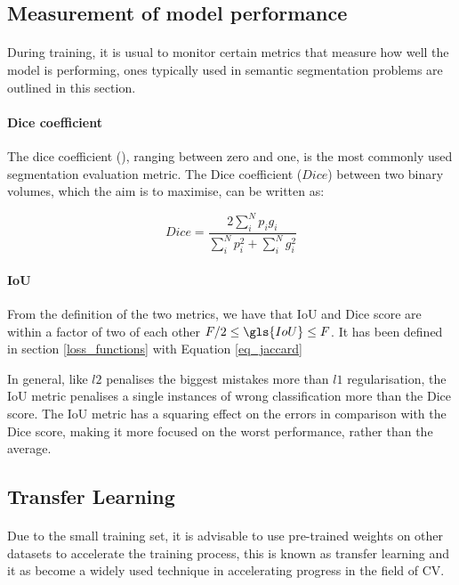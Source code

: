 \subsection{Measurement of model performance} \label{performance_measures}
\paragraph{}
During training, it is usual to monitor certain metrics that measure how well the model is performing, ones typically used in semantic segmentation problems are outlined in this section.
\paragraph{Dice coefficient}
The dice coefficient (\cite{7785132}), ranging between zero and one, is the most commonly used segmentation evaluation metric. The Dice coefficient ($Dice$) between two binary volumes, which the aim is to maximise, can be written as:

\begin{equation}
    \label{eq_dice_coef}
    Dice=\frac{2\sum_{{i}}^{N}p_{i}g_{i}}{\sum_{i}^{N}p_{i}^{2}+\sum_{i}^{N}g_{{i}}^{2}}
\end{equation}

\paragraph{\gls{IoU}}
From the definition of the two metrics, we have that \gls{IoU} and Dice score are within a factor of two of each other $F/2 \leq \gls{IoU} \leq F$. It has been defined in section \ref{loss_functions} with Equation \ref{eq_jaccard}

In general, like $l2$ penalises the biggest mistakes more than $l1$ regularisation, the \gls{IoU} metric penalises a single instances of wrong classification more than the Dice score. The \gls{IoU} metric has a squaring effect on the errors in comparison with the Dice score, making it more focused on the worst performance, rather than the average.

\subsection{Transfer Learning} \label{transfer_learning}
\paragraph{}
Due to the small training set, it is advisable to use pre-trained weights on other datasets to accelerate the training process, this is known as transfer learning and it as become a widely used technique in accelerating progress in the field of \gls{CV}.

